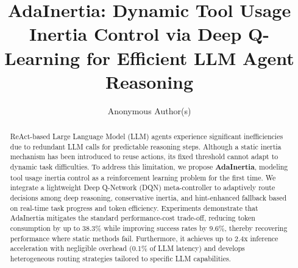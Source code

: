 \documentclass[runningheads]{llncs}
\title{AdaInertia: Dynamic Tool Usage Inertia Control via Deep Q-Learning for Efficient LLM Agent Reasoning}
\author{Anonymous Author(s)}
\institute{Paper under Double-Blind Review}
\begin{document}
\maketitle
\begin{abstract}
ReAct-based Large Language Model (LLM) agents experience significant inefficiencies due to redundant LLM calls for predictable reasoning steps. Although a static inertia mechanism has been introduced to reuse actions, its fixed threshold cannot adapt to dynamic task difficulties. To address this limitation, we propose \textbf{AdaInertia}, modeling tool usage inertia control as a reinforcement learning problem for the first time. We integrate a lightweight Deep Q-Network (DQN) meta-controller to adaptively route decisions among deep reasoning, conservative inertia, and hint-enhanced fallback based on real-time task progress and token efficiency. Experiments demonstrate that AdaInertia mitigates the standard performance-cost trade-off, reducing token consumption by up to 38.3\% while improving success rates by 9.6\%, thereby recovering performance where static methods fail. Furthermore, it achieves up to 2.4x inference acceleration with negligible overhead (0.1\% of LLM latency) and develops heterogeneous routing strategies tailored to specific LLM capabilities.
\end{abstract}
\end{document}
